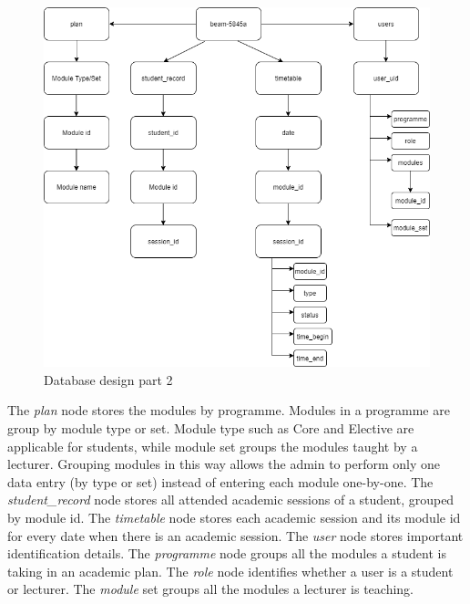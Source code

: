 \documentclass[../report.tex]{subfiles}
\begin{document}
\begin{figure}[H]
\centering
\includegraphics[width=\textwidth]{./images/05-08-database-2.png}
\caption{Database design part 2}
\label{fig:database-design-2}
\end{figure}

The \textit{plan} node stores the modules by programme. Modules in a programme are group by module type or set. Module type such as Core and Elective are applicable for students, while module set groups the modules taught by a lecturer. Grouping modules in this way allows the admin to perform only one data entry (by type or set) instead of entering each module one-by-one. The \textit{student\_record} node stores all attended academic sessions of a student, grouped by module id. The \textit{timetable} node stores each academic session and its module id for every date when there is an academic session. The \textit{user} node stores important identification details. The \textit{programme} node groups all the modules a student is taking in an academic plan. The \textit{role} node identifies whether a user is a student or lecturer. The \textit{module} set groups all the modules a lecturer is teaching. 
\end{document}
